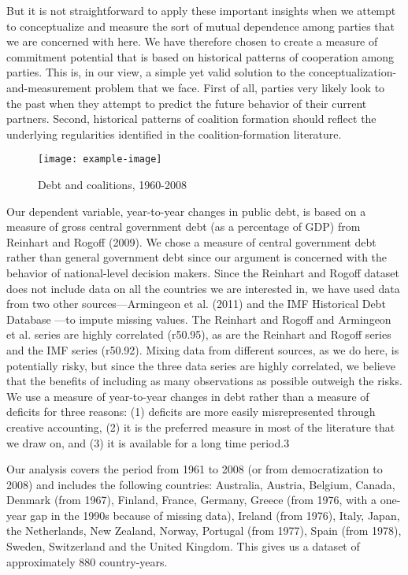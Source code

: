\documentclass{cup_PSRM}
\begin{document}
But it is not straightforward to apply these important insights when we attempt to
conceptualize and measure the sort of mutual dependence among parties that we are
concerned with here. We have therefore chosen to create a measure of commitment
potential that is based on historical patterns of cooperation among parties. This is, in our
view, a simple yet valid solution to the conceptualization-and-measurement problem that
we face. First of all, parties very likely look to the past when they attempt to predict the
future behavior of their current partners. Second, historical patterns of coalition formation
should reflect the underlying regularities identified in the coalition-formation literature.
\begin{figure}%
\centering
\texttt{[image: example-image]}
\caption{Debt and coalitions, 1960-2008}
\end{figure}
Our dependent variable, year-to-year changes in public debt, is based on a measure of
gross central government debt (as a percentage of GDP) from Reinhart and Rogoff (2009).
We chose a measure of central government debt rather than general government debt
since our argument is concerned with the behavior of national-level decision makers.
Since the Reinhart and Rogoff dataset does not include data on all the countries we are
interested in, we have used data from two other sources---Armingeon et al. (2011) and
the IMF Historical Debt Database \citep{abbas2010historical}---to impute missing values. The
Reinhart and Rogoff and Armingeon et al. series are highly correlated (r50.95), as are
the Reinhart and Rogoff series and the IMF series (r50.92). Mixing data from different
sources, as we do here, is potentially risky, but since the three data series are highly
correlated, we believe that the benefits of including as many observations as possible
outweigh the risks. We use a measure of year-to-year changes in debt rather than a
measure of deficits for three reasons: (1) deficits are more easily misrepresented through
creative accounting, (2) it is the preferred measure in most of the literature that we draw
on, and (3) it is available for a long time period.3

Our analysis covers the period from 1961 to 2008 (or from democratization to 2008)
and includes the following countries: Australia, Austria, Belgium, Canada, Denmark
(from 1967), Finland, France, Germany, Greece (from 1976, with a one-year gap in the
1990s because of missing data), Ireland (from 1976), Italy, Japan, the Netherlands, New
Zealand, Norway, Portugal (from 1977), Spain (from 1978), Sweden, Switzerland and the
United Kingdom. This gives us a dataset of approximately 880 country-years.
\end{document}
